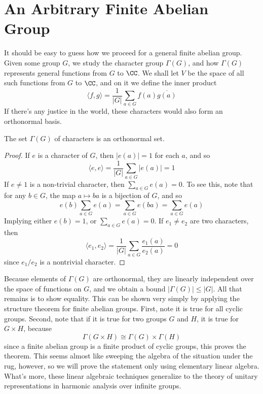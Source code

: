 \section{An Arbitrary Finite Abelian Group}

It should be easy to guess how we proceed for a general finite abelian group. Given some group $G$, we study the character group $\Gamma(G)$, and how $\Gamma(G)$ represents general functions from $G$ to $\CC$. We shall let $V$ be the space of all such functions from $G$ to $\CC$, and on it we define the inner product
%
\[ \langle f, g \rangle = \frac{1}{|G|} \sum_{a \in G} f(a) \overline{g(a)} \]
%
If there's any justice in the world, these characters would also form an orthonormal basis.

\begin{theorem}
    The set $\Gamma(G)$ of characters is an orthonormal set.
\end{theorem}
\begin{proof}
    If $e$ is a character of $G$, then $|e(a)| = 1$ for each $a$, and so
    \[ \langle e, e \rangle = \frac{1}{|G|} \sum_{a \in G} |e(a)| = 1 \]
    If $e \neq 1$ is a non-trivial character, then $\sum_{a \in G} e(a) = 0$. To see this, note that for any $b \in G$, the map $a \mapsto ba$ is a bijection of $G$, and so
    \[ e(b) \sum_{a \in G} e(a) = \sum_{a \in G} e(ba) = \sum_{a \in G} e(a) \]
    Implying either $e(b) = 1$, or $\sum_{a \in G} e(a) = 0$. If $e_1 \neq e_2$ are two characters, then
    \[ \langle e_1, e_2 \rangle = \frac{1}{|G|} \sum_{a \in G} \frac{e_1(a)}{e_2(a)} = 0 \]
    since $e_1/e_2$ is a nontrivial character.
\end{proof}

Because elements of $\Gamma(G)$ are orthonormal, they are linearly independent over the space of functions on $G$, and we obtain a bound $|\Gamma(G)| \leq |G|$. All that remains is to show equality. This can be shown very simply by applying the structure theorem for finite abelian groups. First, note it is true for all cyclic groups. Second, note that if it is true for two groups $G$ and $H$, it is true for $G \times H$, because
%
\[ \Gamma(G \times H) \cong \Gamma(G) \times \Gamma(H) \]
%
since a finite abelian group is a finite product of cyclic groups, this proves the theorem. This seems almost like sweeping the algebra of the situation under the rug, however, so we will prove the statement only using elementary linear algebra. What's more, these linear algebraic techniques generalize to the theory of unitary representations in harmonic analysis over infinite groups.

